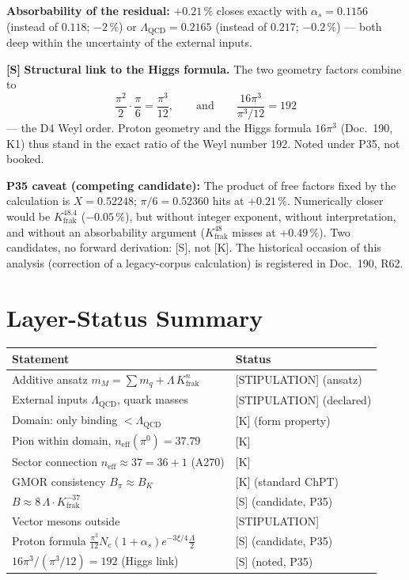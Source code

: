 \textbf{Absorbability of the residual:} $+0{.}21\,\%$ closes exactly
with $\alpha_s = 0{.}1156$ (instead of $0{.}118$; $-2\,\%$) or
$\Lambda_\text{QCD} = 0{.}2165$ (instead of $0{.}217$; $-0{.}2\,\%$)
--- both deep within the uncertainty of the external inputs.

\medskip
\textbf{[S]} \textbf{Structural link to the Higgs formula.} The two
geometry factors combine to
\[
  \frac{\pi^2}{2}\cdot\frac{\pi}{6} = \frac{\pi^3}{12},
  \qquad\text{and}\qquad
  \frac{16\pi^3}{\pi^3/12} = 192
\]
--- the D4 Weyl order. Proton geometry and the Higgs formula $16\pi^3$
(Doc.~190, K1) thus stand in the exact ratio of the Weyl number 192.
Noted under P35, not booked.

\medskip
\textbf{P35 caveat (competing candidate):} The product of free factors
fixed by the calculation is $X = 0{.}52248$; $\pi/6 = 0{.}52360$ hits
at $+0{.}21\,\%$. Numerically closer would be
$K_\text{frak}^{48{.}4}$ ($-0{.}05\,\%$), but without integer exponent,
without interpretation, and without an absorbability argument
($K_\text{frak}^{48}$ misses at $+0{.}49\,\%$). Two candidates, no
forward derivation: [S], not [K]. The historical occasion of this
analysis (correction of a legacy-corpus calculation) is registered in
Doc.~190, R62.

\section{Layer-Status Summary}

\begin{center}
\renewcommand{\arraystretch}{1.3}
{\small\begin{tabular}{ll}
\toprule
Statement & Status \\
\midrule
Additive ansatz $m_M = \sum m_q + \Lambda\,K_\text{frak}^{n}$ & [STIPULATION] (ansatz) \\
External inputs $\Lambda_\text{QCD}$, quark masses & [STIPULATION] (declared) \\
Domain: only binding $<\Lambda_\text{QCD}$ & [K] (form property) \\
Pion within domain, $n_\text{eff}(\pi^0)=37{.}79$ & [K] \\
Sector connection $n_\text{eff}\approx 37 = 36+1$ (A270) & [K] \\
GMOR consistency $B_\pi \approx B_K$ & [K] (standard ChPT) \\
$B \approx 8\,\Lambda\cdot K_\text{frak}^{-37}$ & [S] (candidate, P35) \\
Vector mesons outside & [STIPULATION] \\
Proton formula $\frac{\pi^3}{12}N_c(1+\alpha_s)e^{-3\xi/4}\frac{\Lambda}{2}$ & [S] (candidate, P35) \\
$16\pi^3/(\pi^3/12)=192$ (Higgs link) & [S] (noted, P35) \\
\bottomrule
\end{tabular}}
\renewcommand{\arraystretch}{1.0}
\end{center}


